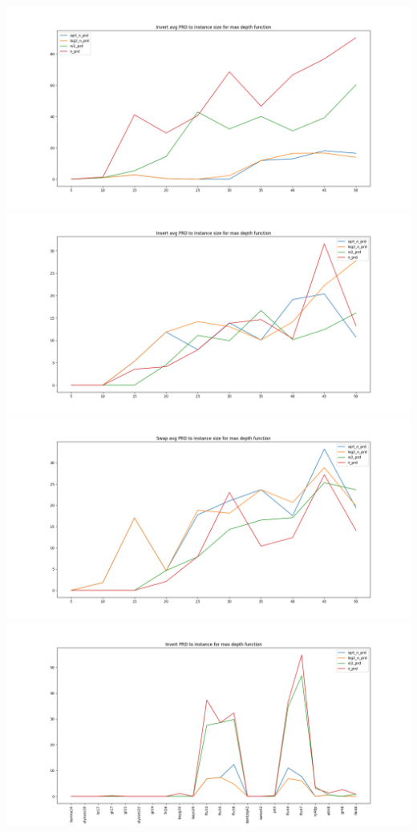\documentclass{article}
\begin{document}
\begin{multicols}{2}
    \begin{center}
      \includegraphics[scale=0.2]{rand_depth_inv_prd.png}
      \includegraphics[scale=0.2]{rand_depth_ins_prd.png}
      \includegraphics[scale=0.2]{rand_depth_swp_prd.png}
      \includegraphics[scale=0.2]{depth_inv_prd.png}

\end{center}
\end{multicols}
\end{document}
